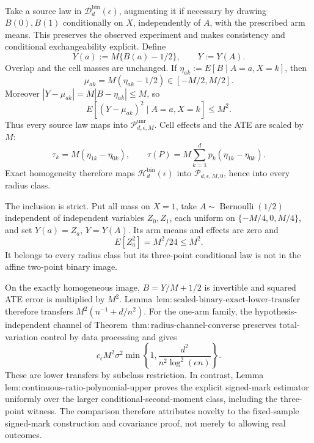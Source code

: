 Take a source law in \(\mathcal D_d^{\mathrm{bin}}(\epsilon)\), augmenting it if necessary by drawing \(B(0),B(1)\) conditionally on \(X\), independently of \(A\), with the prescribed arm means.  This preserves the observed experiment and makes consistency and conditional exchangeability explicit.  Define
\[
 Y(a):=M\{B(a)-1/2\},\qquad Y:=Y(A).
\tag{1}
\]
Overlap and the cell masses are unchanged.  If \(\eta_{ak}:=E[B\mid A=a,X=k]\), then
\[
 \mu_{ak}=M(\eta_{ak}-1/2)\in[-M/2,M/2].
\tag{2}
\]
Moreover \(|Y-\mu_{ak}|=M|B-\eta_{ak}|\le M\), so
\[
 E[(Y-\mu_{ak})^2\mid A=a,X=k]\le M^2.
\tag{3}
\]
Thus every source law maps into \(\mathcal P_{d,\epsilon,M}^{\mathrm{unr}}\).  Cell effects and the ATE are scaled by \(M\):
\[
 \tau_k=M(\eta_{1k}-\eta_{0k}),\qquad
 \tau(P)=M\sum_{k=1}^dp_k(\eta_{1k}-\eta_{0k}).
\tag{4}
\]
Exact homogeneity therefore maps \(\mathcal H_d^{\mathrm{bin}}(\epsilon)\) into \(\mathcal P_{d,\epsilon,M,0}\), hence into every radius class.

The inclusion is strict.  Put all mass on \(X=1\), take \(A\sim\operatorname{Bernoulli}(1/2)\) independent of independent variables \(Z_0,Z_1\), each uniform on \(\{-M/4,0,M/4\}\), and set \(Y(a)=Z_a\), \(Y=Y(A)\).  Its arm means and effects are zero and
\[
 E[Z_a^2]=M^2/24\le M^2.
\tag{5}
\]
It belongs to every radius class but its three-point conditional law is not in the affine two-point binary image.

On the exactly homogeneous image, \(B=Y/M+1/2\) is invertible and squared ATE error is multiplied by \(M^2\).  Lemma~\(\mathrm{lem:scaled\text{-}binary\text{-}exact\text{-}lower\text{-}transfer}\) therefore transfers \(M^2(n^{-1}+d/n^2)\).  For the one-arm family, the hypothesis-independent channel of Theorem~\(\mathrm{thm:radius\text{-}channel\text{-}converse}\) preserves total-variation control by data processing and gives
\[
 c_\epsilon M^2\sigma^2\min\left\{1,\frac{d^2}{n^2\log^2(en)}\right\}.
\tag{6}
\]
These are lower transfers by subclass restriction.  In contrast, Lemma~\(\mathrm{lem:continuous\text{-}ratio\text{-}polynomial\text{-}upper}\) proves the explicit signed-mark estimator uniformly over the larger conditional-second-moment class, including the three-point witness.  The comparison therefore attributes novelty to the fixed-sample signed-mark construction and covariance proof, not merely to allowing real outcomes.